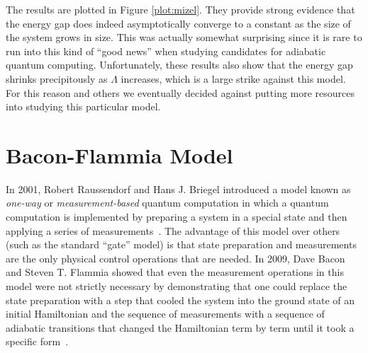 \documentclass[12pt]{amsbook}
\theoremstyle{plain}
\theoremstyle{definition}
\theoremstyle{remark}
\begin{document}
The results are plotted in Figure \ref{plot:mizel}.  They provide strong evidence that the energy gap does indeed asymptotically converge to a constant as the size of the system grows in size.  This was actually somewhat surprising since it is rare to run into this kind of ``good news'' when studying candidates for adiabatic quantum computing.  Unfortunately, these results also show that the energy gap shrinks precipitously as $\Lambda$ increases, which is a large strike against this model.  For this reason and others we eventually decided against putting more resources into studying this particular model.
\section{Bacon-Flammia Model}
\label{sec:BaconFlammiaModel}

In 2001, Robert Raussendorf and Hans J. Briegel introduced a model known as \emph{one-way} or \emph{measurement-based} quantum computation in which a quantum computation is implemented by preparing a system in a special state and then applying a series of measurements~\cite{PhysRevLett.86.5188}.  The advantage of this model over others (such as the standard ``gate'' model) is that state preparation and measurements are the only physical control operations that are needed.  In 2009, Dave Bacon and Steven T. Flammia showed that even the measurement operations in this model were not strictly necessary by demonstrating that one could replace the state preparation with a step that cooled the system into the ground state of an initial Hamiltonian and the sequence of measurements with a sequence of adiabatic transitions that changed the Hamiltonian term by term until it took a specific form~\cite{Bacon2009}.
\end{document}

